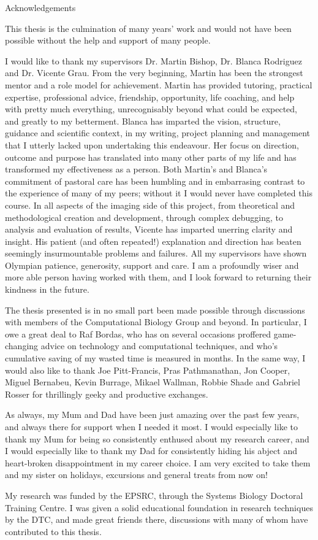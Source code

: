 \vspace*{20mm}
{
\Large\bf
\begin{center}
Acknowledgements
\end{center}
}

This thesis is the culmination of many years' work and would not have been possible without the help and support of many people. 

I would like to thank my supervisors Dr. Martin Bishop, Dr. Blanca Rodriguez and Dr. Vicente Grau. From the very beginning, Martin has been the strongest mentor and a role model for achievement. Martin has provided tutoring, practical expertise, professional advice, friendship, opportunity, life coaching, and help with pretty much everything, unrecognisably beyond what could be expected, and greatly to my betterment. Blanca has imparted the vision, structure, guidance and scientific context, in my writing, project planning and management that I utterly lacked upon undertaking this endeavour. Her focus on direction, outcome and purpose has translated into many other parts of my life and has transformed my effectiveness as a person. Both Martin's and Blanca's commitment of pastoral care has been humbling and in embarrasing contrast to the experience of many of my peers; without it I would never have completed this course. In all aspects of the imaging side of this project, from theoretical and methodological creation and development, through complex debugging, to analysis and evaluation of results, Vicente has imparted unerring clarity and insight. His patient (and often repeated!) explanation and direction has beaten seemingly insurmountable problems and failures. All my supervisors have shown Olympian patience, generosity, support and care. I am a profoundly wiser and more able person having worked with them, and I look forward to returning their kindness in the future.

The thesis presented is in no small part been made possible through discussions with members of the Computational Biology Group and beyond. In particular, I owe a great deal to Raf Bordas, who has on several occasions proffered game-changing advice on technology and computational techniques, and who's cumulative saving of my wasted time is measured in months. In the same way, I would also like to thank Joe Pitt-Francis, Pras Pathmanathan, Jon Cooper, Miguel Bernabeu, Kevin Burrage, Mikael Wallman, Robbie Shade and Gabriel Rosser for thrillingly geeky and productive exchanges.

As always, my Mum and Dad have been just amazing over the past few years, and always there for support when I needed it most. I would especially like to thank my Mum for being so consistently enthused about my research career, and I would especially like to thank my Dad for consistently hiding his abject and heart-broken disappointment in my career choice. I am very excited to take them and my sister on holidays, excursions and general treats from now on!

My research was funded by the EPSRC, through the Systems Biology Doctoral Training Centre. I was given a solid educational foundation in research techniques by the DTC, and made great friends there, discussions with many of whom have contributed to this thesis.
